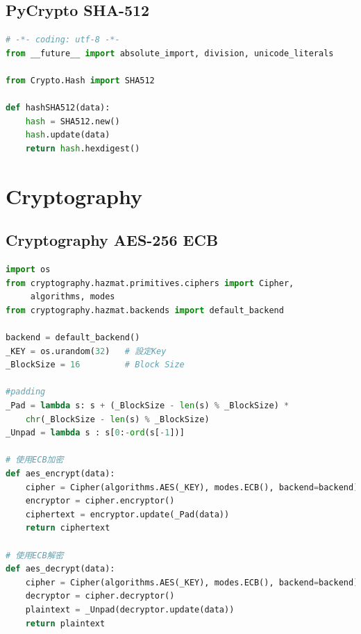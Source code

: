\documentclass[12pt,a4paper]{article}
\begin{document}
\subsection{PyCrypto SHA-512}
{
\begin{lstlisting}[language=Python]
# -*- coding: utf-8 -*-
from __future__ import absolute_import, division, unicode_literals

from Crypto.Hash import SHA512

def hashSHA512(data):
    hash = SHA512.new()
    hash.update(data)
    return hash.hexdigest()
\end{lstlisting}
}

\newpage %
\section{Cryptography}

\subsection{Cryptography AES-256 ECB}
{
\begin{lstlisting}[language=Python]
import os
from cryptography.hazmat.primitives.ciphers import Cipher,
	 algorithms, modes
from cryptography.hazmat.backends import default_backend

backend = default_backend()
_KEY = os.urandom(32)	# 設定Key
_BlockSize = 16	        # Block Size

#padding
_Pad = lambda s: s + (_BlockSize - len(s) % _BlockSize) * 
	chr(_BlockSize - len(s) % _BlockSize)
_Unpad = lambda s : s[0:-ord(s[-1])]

# 使用ECB加密
def aes_encrypt(data):
    cipher = Cipher(algorithms.AES(_KEY), modes.ECB(), backend=backend)
    encryptor = cipher.encryptor()
    ciphertext = encryptor.update(_Pad(data))
    return ciphertext

# 使用ECB解密
def aes_decrypt(data):
    cipher = Cipher(algorithms.AES(_KEY), modes.ECB(), backend=backend)
    decryptor = cipher.decryptor()
    plaintext = _Unpad(decryptor.update(data))
    return plaintext
\end{lstlisting}
}
\end{document}
